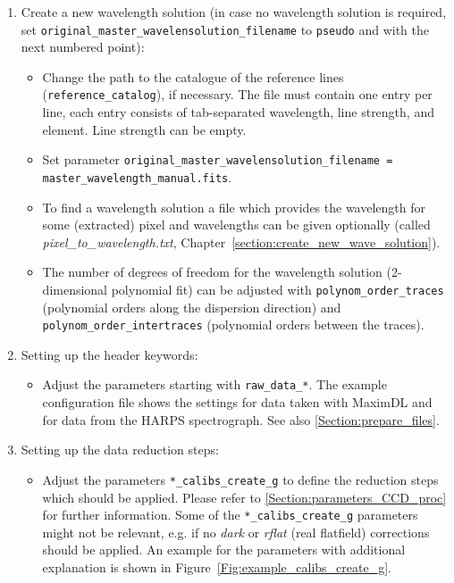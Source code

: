 \documentclass[10pt,a4paper]{article}
\begin{document}
\begin{enumerate}
  \item Create a new wavelength solution (in case no wavelength solution is required, set \verb|original_master_wavelensolution_filename| to \verb|pseudo| and with the next numbered point): \vspace*{-\itemsep}
  \begin{itemize}[leftmargin=*]\setlength\itemsep{0em}
    \item Change the path to the catalogue of the reference lines (\verb|reference_catalog|), if necessary. The file must contain one entry per line, each entry consists of tab-separated wavelength, line strength, and element. Line strength can be empty.
    \item Set parameter \verb|original_master_wavelensolution_filename =| \\
          \verb|master_wavelength_manual.fits|.
    \item To find a wavelength solution a file which provides the wavelength for some (extracted) pixel and wavelengths can be given optionally (called \textit{pixel\_to\_wavelength.txt}, Chapter~\ref{section:create_new_wave_solution}).
    \item The number of degrees of freedom for the wavelength solution (2-dimensional polynomial fit) can be adjusted with \verb|polynom_order_traces| (polynomial orders along the dispersion direction) and \verb|polynom_order_intertraces| (polynomial orders between the traces).
  \end{itemize}
  
  \item Setting up the header keywords: \vspace*{-\itemsep}
  \begin{itemize}[leftmargin=*]\setlength\itemsep{0em}
    \item Adjust the parameters starting with \verb|raw_data_*|. The example configuration file shows the settings for data taken with MaximDL and for data from the HARPS spectrograph. See also \ref{Section:prepare_files}.
  \end{itemize}
     
  \item Setting up the data reduction steps: \vspace*{-\itemsep}
  \begin{itemize}[leftmargin=*]\setlength\itemsep{0em}
    \item Adjust the parameters \verb|*_calibs_create_g| to define the reduction steps which should be applied. Please refer to \ref{Section:parameters_CCD_proc} for further information. Some of the \verb|*_calibs_create_g| parameters might not be relevant, e.g. if no \textit{dark} or \textit{rflat} (real flatfield) corrections should be applied. An example for the parameters with additional explanation is shown in Figure~\ref{Fig:example_calibs_create_g}.
  \end{itemize}


\end{enumerate}
\end{document}
